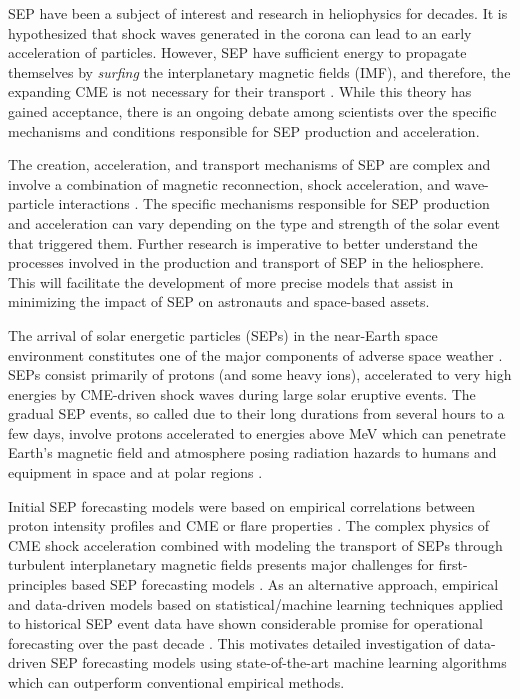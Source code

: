 SEP have been a subject of interest and research in heliophysics for decades. It is hypothesized that shock waves generated in the corona can lead to an early acceleration of particles. However, SEP have sufficient energy to propagate themselves by \textit{surfing} the interplanetary magnetic fields (IMF), and therefore, the expanding CME is not necessary for their transport \citep{reames_2000, kota_2005, kozarev_2019, kozarev_2022}. While this theory has gained acceptance, there is an ongoing debate among scientists over the specific mechanisms and conditions responsible for SEP production and acceleration.

The creation, acceleration, and transport mechanisms of SEP are complex and involve a combination of magnetic reconnection, shock acceleration, and wave-particle interactions \citep{li_2003, li_2012b, ng_2012}. The specific mechanisms responsible for SEP production and acceleration can vary depending on the type and strength of the solar event that triggered them. Further research is imperative to better understand the processes involved in the production and transport of SEP in the heliosphere. This will facilitate the development of more precise models that assist in minimizing the impact of SEP on astronauts and space-based assets.

The arrival of solar energetic particles (SEPs) in the near-Earth space environment constitutes one of the major components of adverse space weather \citep{reames_1999, vainio_2009}. SEPs consist primarily of protons (and some heavy ions), accelerated to very high energies by CME-driven shock waves during large solar eruptive events. The gradual SEP events, so called due to their long durations from several hours to a few days, involve protons accelerated to energies above  MeV which can penetrate Earth’s magnetic field and atmosphere posing radiation hazards to humans and equipment in space and at polar regions \citep{reames_2013}.

Initial SEP forecasting models were based on empirical correlations between proton intensity profiles and CME or flare properties \citep{kahler_2007}. The complex physics of CME shock acceleration combined with modeling the transport of SEPs through turbulent interplanetary magnetic fields presents major challenges for first-principles based SEP forecasting models \citep{aran_2006, laitinen_2017}. As an alternative approach, empirical and data-driven models based on statistical/machine learning techniques applied to historical SEP event data have shown considerable promise for operational forecasting over the past decade \citep{laurenza_2009, camporeale_2019, kozarev_2022}. This motivates detailed investigation of data-driven SEP forecasting models using state-of-the-art machine learning algorithms which can outperform conventional empirical methods.

